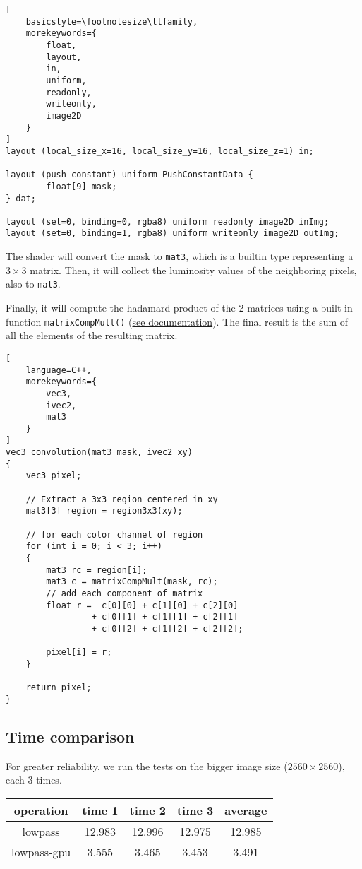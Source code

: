 \documentclass[12pt]{article}
\begin{document}
\begin{lstlisting}[
    basicstyle=\footnotesize\ttfamily,
    morekeywords={
        float,
        layout,
        in,
        uniform,
        readonly,
        writeonly,
        image2D
    }
]
layout (local_size_x=16, local_size_y=16, local_size_z=1) in;

layout (push_constant) uniform PushConstantData {
        float[9] mask;
} dat;

layout (set=0, binding=0, rgba8) uniform readonly image2D inImg;
layout (set=0, binding=1, rgba8) uniform writeonly image2D outImg;
\end{lstlisting}

The shader will convert the mask to \lstinline{mat3}, which is a builtin type representing a $3\times3$ matrix.
Then, it will collect the luminosity values of the neighboring pixels, also to \lstinline{mat3}.

Finally, it will compute the hadamard product of the 2 matrices using a built-in function \lstinline{matrixCompMult()} (\href{https://registry.khronos.org/OpenGL-Refpages/gl4/html/matrixCompMult.xhtml}{see documentation}).
The final result is the sum of all the elements of the resulting matrix.

\begin{lstlisting}[
    language=C++,
    morekeywords={
        vec3,
        ivec2,
        mat3
    }
]
vec3 convolution(mat3 mask, ivec2 xy)
{
    vec3 pixel;

    // Extract a 3x3 region centered in xy
    mat3[3] region = region3x3(xy);

    // for each color channel of region
    for (int i = 0; i < 3; i++)
    {
        mat3 rc = region[i];
        mat3 c = matrixCompMult(mask, rc);
        // add each component of matrix
        float r =  c[0][0] + c[1][0] + c[2][0]
                 + c[0][1] + c[1][1] + c[2][1]
                 + c[0][2] + c[1][2] + c[2][2];

        pixel[i] = r;
    }

    return pixel;
}
\end{lstlisting}

\subsection{Time comparison}

For greater reliability, we run the tests on the bigger image size ($2560 \times 2560$), each 3 times.

\begin{table}[H]\centering
    \begin{tabular}{c|ccc|c}
        \toprule
        operation   & time 1 & time 2 & time 3 & average \\ \midrule
        lowpass     & 12.983 & 12.996 & 12.975 & 12.985  \\
        lowpass-gpu & 3.555  & 3.465  & 3.453  & 3.491   \\
        \bottomrule
    \end{tabular}

\end{table}
\end{document}
